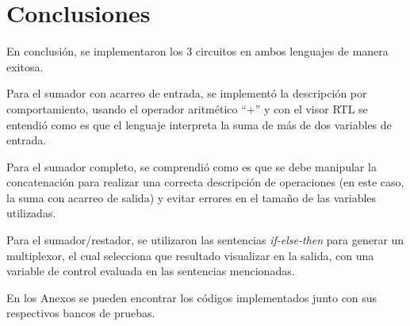 \section{Conclusiones}
En conclusión, se implementaron los 3 circuitos en ambos lenguajes de manera exitosa.

Para el sumador con acarreo de entrada, se implementó la descripción por comportamiento, usando el operador aritmético ``+'' y con el visor RTL se entendió como es que el lenguaje interpreta la suma de más de dos variables de entrada.

Para el sumador completo, se comprendió como es que se debe manipular la concatenación para realizar una correcta descripción de operaciones (en este caso, la suma con acarreo de salida) y evitar errores en el tamaño de las variables utilizadas.

Para el sumador/restador, se utilizaron las sentencias \textit{if-else-then} para generar un multiplexor, el cual selecciona que resultado visualizar en la salida, con una variable de control evaluada en las sentencias mencionadas.

En los Anexos se pueden encontrar los códigos implementados junto con sus respectivos bancos de pruebas.